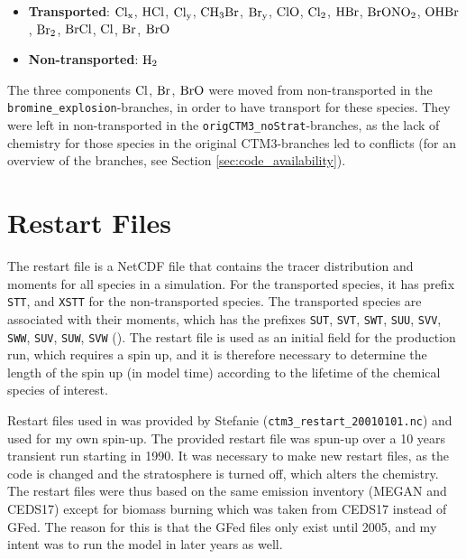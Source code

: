 \begin{itemize}
    \item \textbf{Transported}: $\mathrm{Cl_x}$, $\mathrm{HCl}$, $\mathrm{Cl_y}$, $\mathrm{CH_3Br}$, $\mathrm{Br_y}$, $\mathrm{ClO}$, $\mathrm{Cl_2}$, $\mathrm{HBr}$, $\mathrm{BrONO_2}$, $\mathrm{OHBr}$, $\mathrm{Br_2}$, $\mathrm{BrCl}$, $\mathrm{Cl}$, $\mathrm{Br}$, $\mathrm{BrO}$
    \item \textbf{Non-transported}: $\mathrm{H_2}$
\end{itemize}

The three components $\mathrm{Cl}$, $\mathrm{Br}$, $\mathrm{BrO}$ were moved from non-transported in the \texttt{bromine\_explosion}-branches, in order to have transport for these species. They were left in non-transported in the \texttt{origCTM3\_noStrat}-branches, as the lack of chemistry for those species in the original CTM3-branches led to conflicts (for an overview of the branches, see Section \ref{sec:code_availability}). 




\section{Restart Files}\label{subsec:restart_files}


The restart file is a NetCDF file that contains the tracer distribution and moments for all species in a simulation. For the transported species, it has prefix \texttt{STT}, and \texttt{XSTT} for the non-transported species. The transported species are associated with their moments, which has the prefixes \texttt{SUT}, \texttt{SVT}, \texttt{SWT}, \texttt{SUU}, \texttt{SVV}, \texttt{SWW}, \texttt{SUV}, \texttt{SUW}, \texttt{SVW} (\cite{SovdeManual}). The restart file is used as an initial field for the production run, which requires a spin up, and it is therefore necessary to determine the length of the spin up (in model time) according to the lifetime of the chemical species of interest. 

\medskip

Restart files used in \cite{Falk_2019} was provided by Stefanie (\texttt{ctm3\_restart\_20010101.nc}) and used for my own spin-up. The provided restart file was spun-up over a 10 years transient run starting in 1990. It was necessary to make new restart files, as the code is changed and the stratosphere is turned off, which alters the chemistry. The restart files were thus based on the same emission inventory (MEGAN and CEDS17) except for biomass burning which was taken from CEDS17 instead of GFed. The reason for this is that the GFed files only exist until 2005, and my intent was to run the model in later years as well. 


